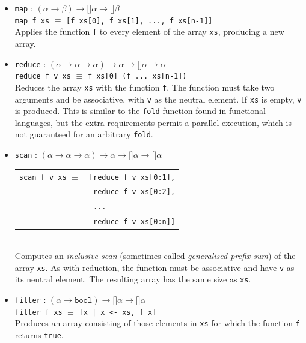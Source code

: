 \begin{itemize}
\item \lstinline{map} : $(\alpha\rightarrow\beta)\rightarrow\texttt{[]}\alpha\rightarrow\texttt{[]}\beta$\hfill\\
  \lstinline{map f xs} $\equiv$ \lstinline{[f xs[0], f xs[1], ..., f xs[n-1]]}\\
  Applies the function \lstinline{f} to every element of the array
  \lstinline{xs}, producing a new array.
\item \lstinline{reduce} : $(\alpha\rightarrow\alpha\rightarrow\alpha)\rightarrow\alpha\rightarrow\texttt{[]}\alpha\rightarrow\alpha$\hfill\\
  \lstinline{reduce f v xs} $\equiv$ \lstinline{f xs[0] (f ... xs[n-1])}\\
  Reduces the array \lstinline{xs} with the function \lstinline{f}.
  The function must take two arguments and be associative, with
  \lstinline{v} as the neutral element.  If \lstinline{xs} is empty,
  \lstinline{v} is produced.  This is similar to the \lstinline{fold}
  function found in functional languages, but the extra requirements
  permit a parallel execution, which is not guaranteed for an
  arbitrary \lstinline{fold}.
\item \lstinline{scan} : $(\alpha\rightarrow\alpha\rightarrow\alpha)\rightarrow\alpha\rightarrow\texttt{[]}\alpha\rightarrow\texttt{[]}\alpha$\hfill\\
  \begin{tabular}{@{}l@{}l}
    {\lstinline!scan f v xs!} $\equiv$ & {\lstinline![reduce f v xs[0:1],!} \\
                                       & {\lstinline! reduce f v xs[0:2],!} \\
                                       & {\lstinline! ...!} \\
                                       & {\lstinline! reduce f v xs[0:n]]!}
  \end{tabular}\\
  Computes an \textit{inclusive scan} (sometimes called
  \textit{generalised prefix sum}) of the array \lstinline{xs}.  As
  with reduction, the function must be associative and have
  \lstinline{v} as its neutral element.  The resulting array has the
  same size as \lstinline{xs}.
\item \lstinline{filter} : $(\alpha\rightarrow\texttt{bool})\rightarrow\texttt{[]}\alpha\rightarrow\texttt{[]}\alpha$\hfill\\
  \lstinline{filter f xs} $\equiv$ \lstinline{[x | x <- xs, f x]}\\
  Produces an array consisting of those elements in \lstinline{xs} for
  which the function \lstinline{f} returns \lstinline{true}.
\end{itemize}

